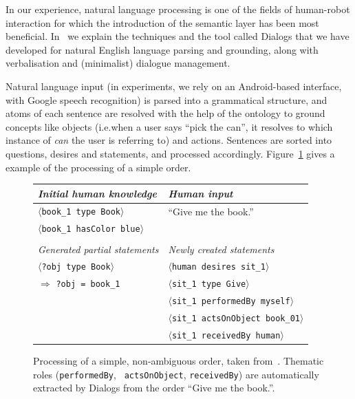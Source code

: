 \documentclass[preprint,3p,times]{elsarticle}
\newcommand{\concept}[1]{{\small \texttt{#1}}}
\newcommand{\stmt}[1]{{\footnotesize\tt$\langle$#1\relax$\rangle$}}
\newcommand{\ie}{{i.e.\xspace}}
\begin{document}
In our experience, natural language processing is one of the fields of
human-robot interaction for which the introduction of the semantic layer has
been most beneficial.  In~\cite{Lemaignan2011a} we explain the techniques and the
tool called {\sc Dialogs} that we have developed for natural English language
parsing and grounding, along with verbalisation and (minimalist) dialogue
management.

Natural language input (in experiments, we rely on an Android-based interface,
with Google speech recognition) is parsed into a grammatical structure, and
atoms of each sentence are resolved with the help of the ontology to ground
concepts like objects (\ie when a user says ``pick the can'', it resolves to which
instance of \emph{can} the user is referring to) and actions. Sentences are
sorted into questions, desires and statements, and processed accordingly.
Figure~\ref{dialogs|ex} gives a example of the processing of a simple order.

\begin{figure}
    \centering
	\begin{tabular}{l|l}
	\emph{Initial human knowledge} &
	\emph{Human input}\\
	
	\hline
	
    	\stmt{book\_1 type Book} &
	``Give me the book.'' \\
	
    	\stmt{book\_1 hasColor blue} & \\
	\vspace{0.5em}\\
	\hline
    	
	\emph{Generated partial statements} &
	\emph{Newly created statements}\\
	\hline
    	\stmt{?obj type Book} & 
	\stmt{human desires sit\_1} \\
	
	\hspace{0.2cm}$\Rightarrow$ \concept{?obj = book\_1}
    	& \stmt{sit\_1 type Give} \\
    	& \stmt{sit\_1 performedBy myself} \\
    	& \stmt{sit\_1 actsOnObject book\_01} \\
    	& \stmt{sit\_1 receivedBy human} \\
	\end{tabular}

    \caption{Processing of a simple, non-ambiguous order, taken
        from~\cite{Lemaignan2011a}. Thematic roles ({\tt performedBy}, {\tt
        actsOnObject}, {\tt receivedBy}) are automatically extracted by 
    {\sc Dialogs} from the order ``Give me the book.''.}

    \label{dialogs|ex}
\end{figure}
\end{document}
